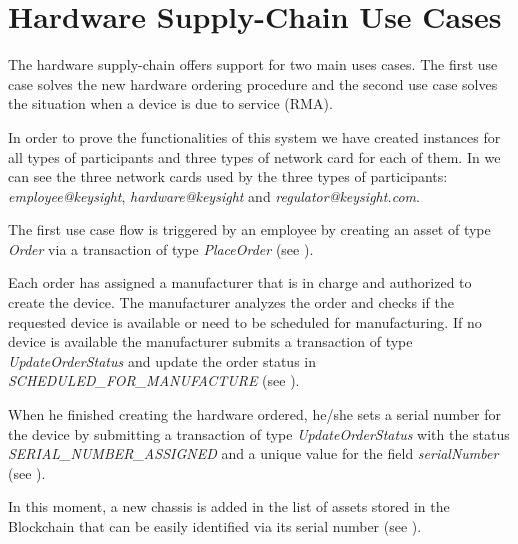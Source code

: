 \section{Hardware Supply-Chain Use Cases}
\label{sub-sec:chapter4-section1}
The hardware supply-chain offers support for two main uses cases. The first use case solves the new hardware ordering procedure and the second use case solves the situation when a device is due to service (RMA).

In order to prove the functionalities of this system we have created instances for all types of participants and three types of network card for each of them. 
In  we can see the three network cards used by the three types of participants: \emph{employee@keysight}, \emph{hardware@keysight} and \emph{regulator@keysight.com}.


The first use case flow is triggered by an employee by creating an asset of type \emph{Order} via a transaction of type \emph{PlaceOrder} (see ). 


Each order has assigned a manufacturer that is in charge and authorized to create the device.
The manufacturer analyzes the order and checks if the requested device is available or need to be scheduled for manufacturing. If no device is available the manufacturer submits a transaction of type \emph{UpdateOrderStatus} and update the order status in \emph{SCHEDULED_FOR_MANUFACTURE} (see ). 


When he finished creating the hardware ordered, he/she sets a serial number for the device by submitting a transaction of type \emph{UpdateOrderStatus} with the status \emph{SERIAL_NUMBER_ASSIGNED} and a unique value for the field \emph{serialNumber} (see ).


In this moment, a new chassis is added in the list of assets stored in the Blockchain that can be easily identified via its serial number (see ).

